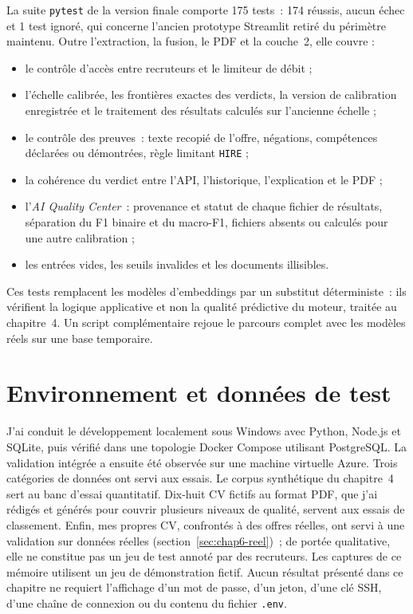 La suite \texttt{pytest} de la version finale comporte 175 tests~: 174 réussis, aucun échec et 1 test ignoré, qui concerne l'ancien prototype Streamlit retiré du périmètre maintenu. Outre l'extraction, la fusion, le PDF et la couche~2, elle couvre :
\begin{itemize}
  \item le contrôle d'accès entre recruteurs et le limiteur de débit ;
  \item l'échelle calibrée, les frontières exactes des verdicts, la version de calibration enregistrée et le traitement des résultats calculés sur l'ancienne échelle ;
  \item le contrôle des preuves~: texte recopié de l'offre, négations, compétences déclarées ou démontrées, règle limitant \texttt{HIRE} ;
  \item la cohérence du verdict entre l'API, l'historique, l'explication et le PDF ;
  \item l'\emph{AI Quality Center}~: provenance et statut de chaque fichier de résultats, séparation du F1 binaire et du macro-F1, fichiers absents ou calculés pour une autre calibration ;
  \item les entrées vides, les seuils invalides et les documents illisibles.
\end{itemize}
Ces tests remplacent les modèles d'embeddings par un substitut déterministe~: ils vérifient la logique applicative et non la qualité prédictive du moteur, traitée au chapitre~4. Un script complémentaire rejoue le parcours complet avec les modèles réels sur une base temporaire.

\section{Environnement et données de test}

J'ai conduit le développement localement sous Windows avec Python, Node.js et SQLite, puis vérifié dans une topologie Docker Compose utilisant PostgreSQL. La validation intégrée a ensuite été observée sur une machine virtuelle Azure. Trois catégories de données ont servi aux essais. Le corpus synthétique du chapitre~4 sert au banc d'essai quantitatif. Dix-huit CV fictifs au format PDF, que j'ai rédigés et générés pour couvrir plusieurs niveaux de qualité, servent aux essais de classement. Enfin, mes propres CV, confrontés à des offres réelles, ont servi à une validation sur données réelles (section~\ref{sec:chap6-reel})~; de portée qualitative, elle ne constitue pas un jeu de test annoté par des recruteurs. Les captures de ce mémoire utilisent un jeu de démonstration fictif. Aucun résultat présenté dans ce chapitre ne requiert l'affichage d'un mot de passe, d'un jeton, d'une clé SSH, d'une chaîne de connexion ou du contenu du fichier \texttt{.env}.

